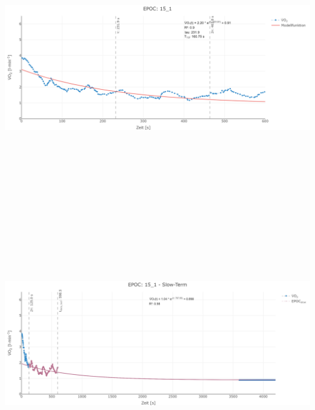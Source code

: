 \documentclass[
  letterpaper,
  DIV=11]{scrartcl}
\begin{document}
\includegraphics[width=11.45833in,height=4.6875in]{images/15_1_tau.png}
\includegraphics[width=11.45833in,height=4.6875in]{images/15_1_slow.png}
\end{document}
